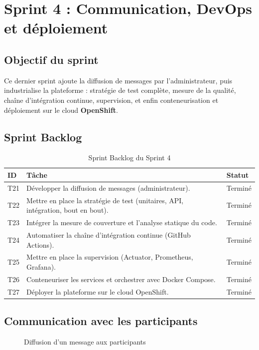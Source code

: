 \section{Sprint 4 : Communication, DevOps et déploiement}

\subsection{Objectif du sprint}
Ce dernier sprint ajoute la diffusion de messages par l'administrateur, puis industrialise la
plateforme : stratégie de test complète, mesure de la qualité, chaîne d'intégration continue,
supervision, et enfin conteneurisation et déploiement sur le cloud \textbf{OpenShift}.

\subsection{Sprint Backlog}
\begin{table}[H]\centering\renewcommand{\arraystretch}{1.25}
\begin{tabular}{|p{1cm}|p{10.5cm}|p{1.6cm}|}\hline
\rowcolor{gray!15}\textbf{ID} & \textbf{Tâche} & \textbf{Statut} \\ \hline
T21 & Développer la diffusion de messages (administrateur). & Terminé \\ \hline
T22 & Mettre en place la stratégie de test (unitaires, API, intégration, bout en bout). & Terminé \\ \hline
T23 & Intégrer la mesure de couverture et l'analyse statique du code. & Terminé \\ \hline
T24 & Automatiser la chaîne d'intégration continue (GitHub Actions). & Terminé \\ \hline
T25 & Mettre en place la supervision (Actuator, Prometheus, Grafana). & Terminé \\ \hline
T26 & Conteneuriser les services et orchestrer avec Docker Compose. & Terminé \\ \hline
T27 & Déployer la plateforme sur le cloud OpenShift. & Terminé \\ \hline
\end{tabular}
\caption{Sprint Backlog du Sprint 4}\label{tab:sb4}
\end{table}

\subsection{Communication avec les participants}
\begin{figure}[H]\centering
  \caption{Diffusion d'un message aux participants}\label{fig:broadcast}
\end{figure}

